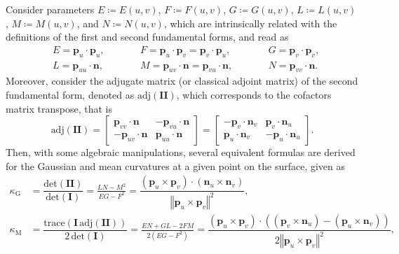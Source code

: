 Consider parameters $E\coloneqq E\left(u,v\right)$, $F\coloneqq F\left(u,v\right)$, $G\coloneqq G\left(u,v\right)$, $L\coloneqq L\left(u,v\right)$, $M\coloneqq M\left(u,v\right)$, and $N\coloneqq N\left(u,v\right)$, which are intrinsically related with the definitions of the first and second fundamental forms, and read as
\begin{equation}
\begin{split}
&E=\bm{p}_{u}\cdot\bm{p}_{u},
\qquad
&&F=\bm{p}_{u}\cdot\bm{p}_{v}=\bm{p}_{v}\cdot\bm{p}_{u},
\qquad
&&G=\bm{p}_{v}\cdot\bm{p}_{v},\\
&L=\bm{p}_{uu}\cdot\bm{n},
\qquad
&&M=\bm{p}_{uv}\cdot\bm{n}=\bm{p}_{vu}\cdot\bm{n},
\qquad
&&N=\bm{p}_{vv}\cdot\bm{n}.
\end{split}
\end{equation}
Moreover, consider the adjugate matrix (or classical adjoint matrix) of the second fundamental form, denoted as $\textrm{adj}\left(\bm{II}\right)$, which corresponds to the cofactors matrix transpose, that is
\begin{equation}
\textrm{adj}\left(\bm{II}\right)
=
\begin{bmatrix}
\bm{p}_{vv}\cdot\bm{n} & -\bm{p}_{vu}\cdot\bm{n}\\
-\bm{p}_{uv}\cdot\bm{n} & \bm{p}_{uu}\cdot\bm{n}
\end{bmatrix}
=
\begin{bmatrix}
-\bm{p}_{v}\cdot\bm{n}_{v} & \bm{p}_{v}\cdot\bm{n}_{u}\\
\bm{p}_{u}\cdot\bm{n}_{v} & -\bm{p}_{u}\cdot\bm{n}_{u}
\end{bmatrix}.
\end{equation}
Then, with some algebraic manipulations, several equivalent formulas are derived for the Gaussian and mean curvatures at a given point on the surface, given as
\begin{align}
\kappa_{\textrm{G}}
&=\dfrac{\textrm{det}\left(\bm{II}\right)}{\textrm{det}\left(\bm{I}\right)}
=\frac{LN-M^{2}}{EG-F^{2}}
=\dfrac{\left(\bm{p}_{u}\times\bm{p}_{v}\right)\cdot\left(\bm{n}_{u}\times\bm{n}_{v}\right)}{\left\Vert\bm{p}_{u}\times\bm{p}_{v}\right\Vert^{2}},\\
\kappa_{\textrm{M}}
&=\dfrac{\textrm{trace}\left(\bm{I}\,\textrm{adj}\left(\bm{II}\right)\right)}{2\,\textrm{det}\left(\bm{I}\right)}
=\frac{EN+GL-2FM}{2\left(EG-F^{2}\right)}
=\dfrac{\left(\bm{p}_{u}\times\bm{p}_{v}\right)\cdot\left(\left(\bm{p}_{v}\times\bm{n}_{u}\right)-\left(\bm{p}_{u}\times\bm{n}_{v}\right)\right)}{2\left\Vert\bm{p}_{u}\times\bm{p}_{v}\right\Vert^{2}},
\end{align}
